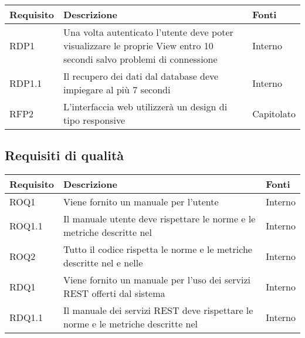 \begin{center}

	\def\arraystretch{1.5}
	\bgroup
	\begin{longtable}{| p{2cm} | p{8cm} | p{2cm} |}

		\hline
		\textbf{Requisito} & \textbf{Descrizione} & \textbf{Fonti} \\
		\hline

		RDP1  &  Una volta autenticato l'utente deve poter visualizzare le proprie View entro 10 secondi salvo problemi di connessione &  Interno \\
		\hline
		RDP1.1  &  Il recupero dei dati dal database deve impiegare al più 7 secondi  &  Interno \\
		\hline
		RFP2  &  L'interfaccia web utilizzerà un design di tipo responsive  &  Capitolato \\
		\hline

	\end{longtable}
	\egroup
\end{center}

\subsection{Requisiti di qualità}

\begin{center}

	\def\arraystretch{1.5}
	\bgroup
	\begin{longtable}{| p{2cm} | p{8cm} | p{2cm} |}

		\hline
		\textbf{Requisito} & \textbf{Descrizione} & \textbf{Fonti} \\
		\hline

		ROQ1  &  Viene fornito un manuale per l'utente  &  Interno \\
		\hline
		ROQ1.1  &  Il manuale utente deve rispettare le norme e le metriche descritte nel \docNameVersionPdQ  &  Interno \\
		\hline
		ROQ2  &  Tutto il codice rispetta le norme e le metriche descritte nel \docNameVersionPdQ{} e nelle \docNameVersionNdP  &  Interno \\
		\hline
		RDQ1  &  Viene fornito un manuale per l'uso dei servizi REST offerti dal sistema  &  Interno \\
		\hline
		RDQ1.1  &  Il manuale dei servizi REST deve rispettare le norme e le metriche descritte nel \docNameVersionPdQ  &  Interno \\
		\hline


	\end{longtable}
	\egroup
\end{center}

